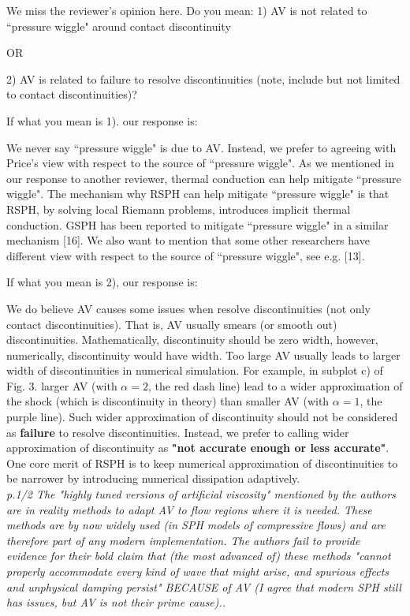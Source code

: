 \documentclass[10pt,a4paper]{article}
\begin{document}
We miss the reviewer's opinion here.
Do you mean: 
1) AV is not related to ``pressure wiggle" around contact discontinuity

OR
 
2) AV is related to failure to resolve discontinuities (note, include but not limited to contact discontinuities)? 

If what you mean is 1). our response is: 

We never say ``pressure wiggle" is due to AV. Instead, we prefer to agreeing with Price's view with respect to the source of ``pressure wiggle". As we mentioned in our response to another reviewer, thermal conduction can help mitigate ``pressure wiggle". The mechanism why RSPH can help mitigate ``pressure wiggle" is that RSPH, by solving local Riemann problems, introduces implicit thermal conduction. GSPH has been reported to mitigate ``pressure wiggle" in a similar mechanism [16]. We also want to mention that some other researchers have different view with respect to the source of ``pressure wiggle", see e.g. [13].

If what you mean is 2), our response is:

We do believe AV causes some issues when resolve discontinuities (not only contact discontinuities). That is, AV usually smears (or smooth out) discontinuities. Mathematically, discontinuity should be zero width, however, numerically, discontinuity would have width. Too large AV usually leads to larger width of discontinuities in numerical simulation. For example, in subplot c) of Fig. 3. larger AV (with $\alpha = 2$, the red dash line) lead to a wider approximation of the shock (which is discontinuity in theory) than smaller AV (with $\alpha = 1$, the purple line). 
Such wider approximation of discontinuity should not be considered as \textbf{failure} to resolve discontinuities. Instead, we prefer to calling wider approximation of discontinuity as \textbf{"not accurate enough or less accurate"}. One core merit of RSPH is to keep numerical approximation of discontinuities to be narrower by introducing numerical dissipation adaptively.
\\[3pt]
 
\textit{p.1/2 The "highly tuned versions of artificial viscosity" mentioned by the authors are in reality methods to adapt AV to flow regions where it is needed. These methods are by now widely used (in SPH models of compressive flows) and are therefore part of any modern implementation.
The authors fail to provide evidence for their bold claim that (the most advanced of) these methods "cannot properly accommodate every kind of wave that might arise, and spurious effects and unphysical damping persist" BECAUSE of AV (I agree that modern SPH still has issues, but AV is not their prime cause)..}
\end{document}
